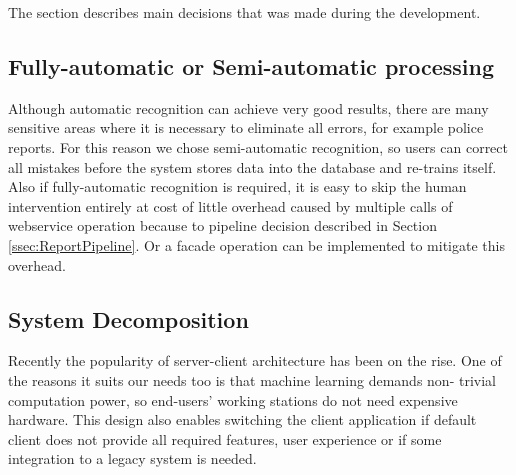
The section describes main decisions that was made during the development. 



\subsection{Fully-automatic or Semi-automatic processing}



Although automatic recognition can achieve very good results, there are many
sensitive areas where it is necessary to eliminate all errors, for example
police reports. For this reason we chose semi-automatic recognition, so users
can correct all mistakes before the system stores data into the database and
re-trains itself. Also if fully-automatic recognition is required, it is easy
to skip the human intervention entirely at cost of little overhead caused by
multiple calls of webservice operation because to pipeline decision described in
Section \ref{ssec:ReportPipeline}. Or a facade operation can be implemented to
mitigate this overhead.

\subsection{System Decomposition}




Recently the popularity of server-client architecture has been on the rise. One
of the reasons it suits our needs too is that machine learning demands non-
trivial computation power, so end-users' working stations do not need expensive
hardware. This design also enables switching the client application if default
\textan{} client does not provide all required features, user experience or if
some integration to a legacy system is needed.

